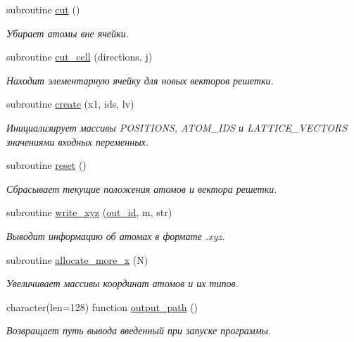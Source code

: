 \begin{DoxyCompactItemize}
subroutine \mbox{\hyperlink{namespacecrystal__lattice_ab23b4fedfcb48100b0fff538f200635b}{cut}} ()
\begin{DoxyCompactList}\small\item\em Убирает атомы вне ячейки. \end{DoxyCompactList}\item 
subroutine \mbox{\hyperlink{namespacecrystal__lattice_a71eb47087ef35ee8f513ae7eaf422375}{cut\+\_\+cell}} (directions, j)
\begin{DoxyCompactList}\small\item\em Находит элементарную ячейку для новых векторов решетки. \end{DoxyCompactList}\item 
subroutine \mbox{\hyperlink{namespacecrystal__lattice_ad70644846195cc9116b59bbc5c0c486b}{create}} (x1, ids, lv)
\begin{DoxyCompactList}\small\item\em Инициализирует массивы P\+O\+S\+I\+T\+I\+O\+NS, A\+T\+O\+M\+\_\+\+I\+DS и L\+A\+T\+T\+I\+C\+E\+\_\+\+V\+E\+C\+T\+O\+RS значениями входных переменных. \end{DoxyCompactList}\item 
subroutine \mbox{\hyperlink{namespacecrystal__lattice_afc4857a08f0790bdfceb31fad36a474a}{reset}} ()
\begin{DoxyCompactList}\small\item\em Сбрасывает текущие положения атомов и вектора решетки. \end{DoxyCompactList}\item 
subroutine \mbox{\hyperlink{namespacecrystal__lattice_a973f0596d4738cf20ad408cc7551a1c9}{write\+\_\+xyz}} (\mbox{\hyperlink{namespacecrystal__lattice_a297a8f77c70b997ba6967443326cd549}{out\+\_\+id}}, m, str)
\begin{DoxyCompactList}\small\item\em Выводит информацию об атомах в формате .xyz. \end{DoxyCompactList}\item 
subroutine \mbox{\hyperlink{namespacecrystal__lattice_a1943406cbde95385437fac84197f9426}{allocate\+\_\+more\+\_\+x}} (N)
\begin{DoxyCompactList}\small\item\em Увеличивает массивы координат атомов и их типов. \end{DoxyCompactList}\item 
character(len=128) function \mbox{\hyperlink{namespacecrystal__lattice_ae9bc1e02bee4558ba4964ecae4c8ab3e}{output\+\_\+path}} ()
\begin{DoxyCompactList}\small\item\em Возвращает путь вывода введенный при запуске программы. \end{DoxyCompactList}\end{DoxyCompactItemize}
